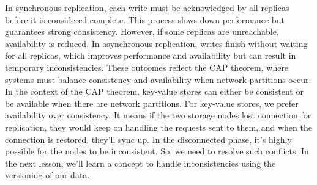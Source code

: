 In synchronous replication, each write must be acknowledged by all replicas before it is considered complete. This process slows down performance but guarantees strong consistency. However, if some replicas are unreachable, availability is reduced. In asynchronous replication, writes finish without waiting for all replicas, which improves performance and availability but can result in temporary inconsistencies. These outcomes reflect the CAP theorem, where systems must balance consistency and availability when network partitions occur.
\\
In the context of the CAP theorem, key-value stores can either be consistent or be available when there are network partitions. For key-value stores, we prefer availability over consistency. It means if the two storage nodes lost connection for replication, they would keep on handling the requests sent to them, and when the connection is restored, they'll sync up. In the disconnected phase, it's highly possible for the nodes to be inconsistent. So, we need to resolve such conflicts. In the next lesson, we'll learn a concept to handle inconsistencies using the versioning of our data.\\
\strut \\

